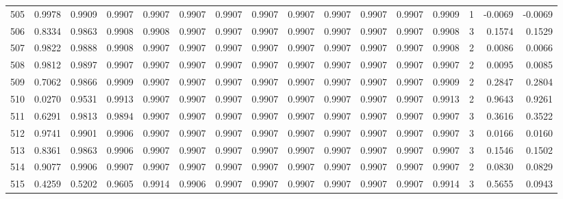 \begin{tabular}{lrrrrrrrrrrrrrrr}
505 &      0.9978 &  0.9909 &  0.9907 &  0.9907 &  0.9907 &  0.9907 &  0.9907 &  0.9907 &  0.9907 &  0.9907 &   0.9907 &     0.9909 &      1 &                   -0.0069 &                    -0.0069 \\
506 &      0.8334 &  0.9863 &  0.9908 &  0.9908 &  0.9907 &  0.9907 &  0.9907 &  0.9907 &  0.9907 &  0.9907 &   0.9907 &     0.9908 &      3 &                    0.1574 &                     0.1529 \\
507 &      0.9822 &  0.9888 &  0.9908 &  0.9907 &  0.9907 &  0.9907 &  0.9907 &  0.9907 &  0.9907 &  0.9907 &   0.9907 &     0.9908 &      2 &                    0.0086 &                     0.0066 \\
508 &      0.9812 &  0.9897 &  0.9907 &  0.9907 &  0.9907 &  0.9907 &  0.9907 &  0.9907 &  0.9907 &  0.9907 &   0.9907 &     0.9907 &      2 &                    0.0095 &                     0.0085 \\
509 &      0.7062 &  0.9866 &  0.9909 &  0.9907 &  0.9907 &  0.9907 &  0.9907 &  0.9907 &  0.9907 &  0.9907 &   0.9907 &     0.9909 &      2 &                    0.2847 &                     0.2804 \\
510 &      0.0270 &  0.9531 &  0.9913 &  0.9907 &  0.9907 &  0.9907 &  0.9907 &  0.9907 &  0.9907 &  0.9907 &   0.9907 &     0.9913 &      2 &                    0.9643 &                     0.9261 \\
511 &      0.6291 &  0.9813 &  0.9894 &  0.9907 &  0.9907 &  0.9907 &  0.9907 &  0.9907 &  0.9907 &  0.9907 &   0.9907 &     0.9907 &      3 &                    0.3616 &                     0.3522 \\
512 &      0.9741 &  0.9901 &  0.9906 &  0.9907 &  0.9907 &  0.9907 &  0.9907 &  0.9907 &  0.9907 &  0.9907 &   0.9907 &     0.9907 &      3 &                    0.0166 &                     0.0160 \\
513 &      0.8361 &  0.9863 &  0.9906 &  0.9907 &  0.9907 &  0.9907 &  0.9907 &  0.9907 &  0.9907 &  0.9907 &   0.9907 &     0.9907 &      3 &                    0.1546 &                     0.1502 \\
514 &      0.9077 &  0.9906 &  0.9907 &  0.9907 &  0.9907 &  0.9907 &  0.9907 &  0.9907 &  0.9907 &  0.9907 &   0.9907 &     0.9907 &      2 &                    0.0830 &                     0.0829 \\
515 &      0.4259 &  0.5202 &  0.9605 &  0.9914 &  0.9906 &  0.9907 &  0.9907 &  0.9907 &  0.9907 &  0.9907 &   0.9907 &     0.9914 &      3 &                    0.5655 &                     0.0943 \\

\end{tabular}
